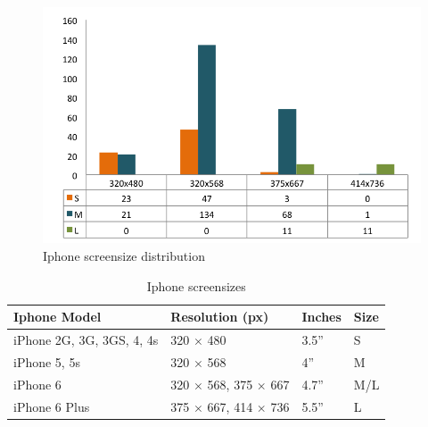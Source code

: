     \begin{figure}[H]
      \centering
      \includegraphics[scale=0.85]{pics/analysis/IphoneScreenDist.png}
      \caption{Iphone screensize distribution}
      \label{fig:iphoneScreenDist}
    \end{figure}

    \begin{table}[H]
      \centering
      \begin{tabular}{ l | l | l | l }
        \hline
        {\bf Iphone Model}  & {\bf Resolution (px)} & {\bf Inches} & {\bf Size} \\ \hline
        iPhone 2G, 3G, 3GS, 4, 4s  &  320 $\times$ 480  &  3.5'' & S\\
        iPhone 5, 5s        &  320 $\times$ 568  &  4'' & M \\
        iPhone 6            &  320 $\times$ 568, 375 $\times$ 667  &  4.7'' & M/L \\
        iPhone 6 Plus       &  375 $\times$ 667, 414 $\times$ 736  &  5.5'' & L \\ \hline        
      \end{tabular}
      \caption{Iphone screensizes}
      \label{tab:iphonescreen}
    \end{table}

